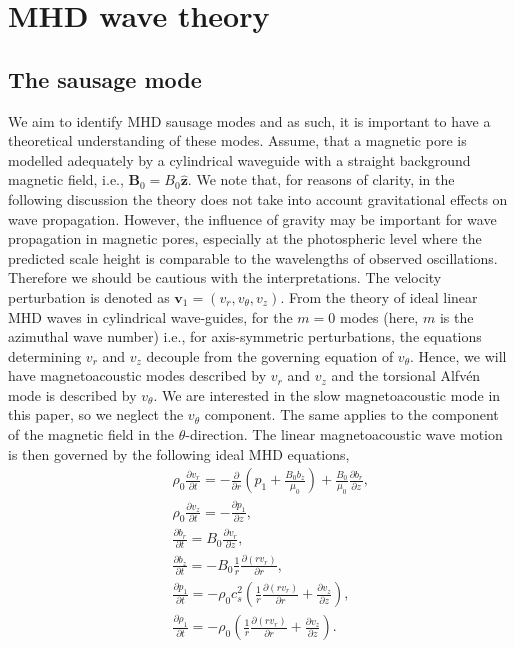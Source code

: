 \section{MHD wave theory}
\label{Wave}
    
    \subsection{The sausage mode}
    \label{Saus}
    
    We aim to identify MHD sausage modes and as such, it is important to have a theoretical understanding of these modes.
    Assume, that a magnetic pore is modelled adequately by a cylindrical waveguide with a straight background magnetic field, i.e., $\textbf{B}_0=B_0\hat{\textbf{z}}$.
    We	note that, for reasons of clarity, in the following discussion the theory does not take into account gravitational effects on wave propagation.
    However, the influence of gravity may be important for wave propagation in magnetic pores, especially at the photospheric level where the predicted scale height is comparable to the wavelengths of observed oscillations.
    Therefore we should be cautious with the interpretations.
    The velocity perturbation is denoted as $\textbf{v}_1= (v_r,v_{\theta},v_z)$.
    From the theory of ideal linear MHD waves in cylindrical wave-guides, for the $m=0$ modes (here, $m$ is the azimuthal wave number) i.e., for axis-symmetric perturbations, the equations determining $v_r$ and $v_z$ decouple from the governing equation of $v_{\theta}$.
    Hence, we will have magnetoacoustic modes described by $v_r$ and $v_z$ and the torsional Alfv\'en mode is described by $v_{\theta}$.
    We are interested in the slow magnetoacoustic mode in this paper, so we neglect the $v_{\theta}$ component.
    The	same applies to the component of the magnetic field in the $\theta$-direction. 
    The linear magnetoacoustic wave motion is then governed by the following ideal MHD equations,
    \begin{align}
        &&\rho_0 \frac{\partial v_r}{\partial t}=-\frac{\partial}{\partial r}
        \left(p_1+\frac{B_0b_z}{\mu_0}\right)+\frac{B_0}{\mu_0}\frac{\partial b_r}{\partial z},
        \label{eq:mom_r}\\
        &&\rho_0\frac{\partial v_z}{\partial t}=-\frac{\partial p_1}{\partial z},
        \label{eq:mom_z}\\
        &&\frac{\partial b_r}{\partial t}=B_0\frac{\partial v_r}{\partial z},
        \label{eq:mag_r}\\
        &&\frac{\partial b_z}{\partial t}=-B_0\frac{1}{r}\frac{\partial (rv_r)}{\partial r},
        \label{eq:mag_z}\\
        &&\frac{\partial p_1}{\partial t}=-\rho_0
        c_s^2\left(\frac{1}{r}\frac{\partial(rv_r)}{\partial r}+\frac{\partial v_z}{\partial z}\right),
        \label{eq:press1}\\
        &&\frac{\partial \rho_1}{\partial t}=-\rho_0\left(\frac{1}{r}\frac{\partial (rv_r)}{\partial r}+\frac{\partial v_z}{\partial z}\right).
        \label{eq:den}
    \end{align}
